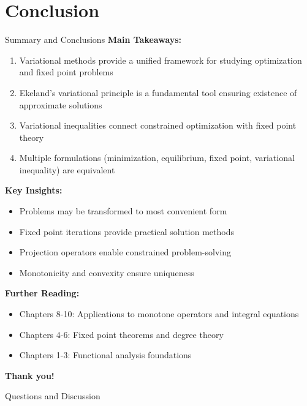 \documentclass[aspectratio=169,10pt]{beamer}
\begin{document}
\section{Conclusion}

\begin{frame}[allowframebreaks]{Summary and Conclusions}
  \textbf{Main Takeaways:}

  \begin{enumerate}
    \item Variational methods provide a unified framework for studying optimization and fixed point problems
    \item Ekeland's variational principle is a fundamental tool ensuring existence of approximate solutions
    \item Variational inequalities connect constrained optimization with fixed point theory
    \item Multiple formulations (minimization, equilibrium, fixed point, variational inequality) are equivalent
  \end{enumerate}

  \vspace{0.5cm}

  \textbf{Key Insights:}
  \begin{itemize}
    \item Problems may be transformed to most convenient form
    \item Fixed point iterations provide practical solution methods
    \item Projection operators enable constrained problem-solving
    \item Monotonicity and convexity ensure uniqueness
  \end{itemize}

  \framebreak

  \textbf{Further Reading:}
  \begin{itemize}
    \item Chapters 8-10: Applications to monotone operators and integral equations
    \item Chapters 4-6: Fixed point theorems and degree theory
    \item Chapters 1-3: Functional analysis foundations
  \end{itemize}

  \vspace{0.5cm}

  {\Large \textbf{Thank you!}}

  \vspace{0.3cm}

  Questions and Discussion
\end{frame}
\end{document}
